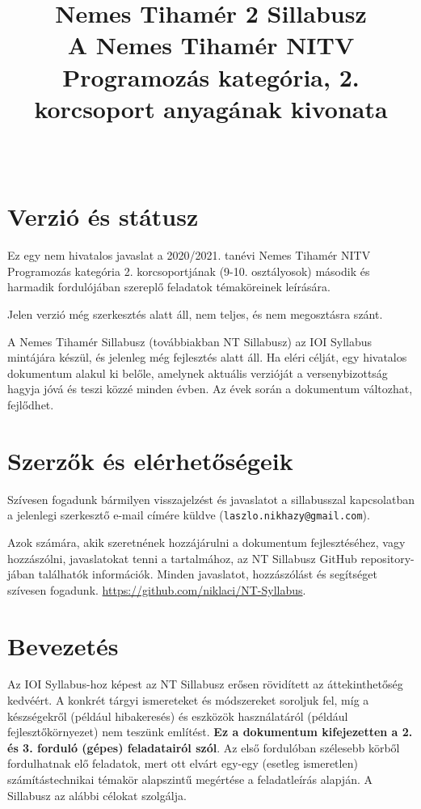 \documentclass[a4paper,11pt,oneside]{article}
\begin{document}
\title{\sf Nemes Tihamér 2 Sillabusz \\
    \large A Nemes Tihamér NITV Programozás kategória, 2. korcsoport anyagának kivonata}
\author{}
\date{~}
\maketitle

\section{Verzió és státusz}%

Ez egy nem hivatalos javaslat a 2020/2021. tanévi Nemes Tihamér NITV Programozás kategória
2. korcsoportjának (9-10. osztályosok) második és harmadik fordulójában szereplő feladatok
témaköreinek leírására.

\medskip

Jelen verzió még szerkesztés alatt áll, nem teljes, és nem megosztásra szánt.

\medskip

A Nemes Tihamér Sillabusz (továbbiakban NT Sillabusz) az IOI Syllabus mintájára készül,
és jelenleg még fejlesztés alatt áll. Ha eléri célját, egy hivatalos dokumentum alakul ki belőle,
amelynek aktuális verzióját a versenybizottság hagyja jóvá és teszi közzé minden évben.
Az évek során a dokumentum változhat, fejlődhet.


\section{Szerzők és elérhetőségeik}%

Szívesen fogadunk bármilyen visszajelzést és javaslatot a sillabusszal kapcsolatban
a jelenlegi szerkesztő e-mail címére küldve (\verb!laszlo.nikhazy@gmail.com!).

Azok számára, akik szeretnének hozzájárulni a dokumentum fejlesztéséhez, vagy hozzászólni,
javaslatokat tenni a tartalmához, az NT Sillabusz GitHub repository-jában találhatók információk.
Minden javaslatot, hozzászólást és segítséget szívesen fogadunk.
\url{https://github.com/niklaci/NT-Syllabus}.

\section{Bevezetés}\label{sec:intro}%

Az IOI Syllabus-hoz képest az NT Sillabusz erősen rövidített az áttekinthetőség kedvéért.
A konkrét tárgyi ismereteket és módszereket soroljuk fel, míg a készségekről (például hibakeresés)
és eszközök használatáról (például fejlesztőkörnyezet) nem teszünk említést. \textbf{Ez a dokumentum kifejezetten
a 2. és 3. forduló (gépes) feladatairól szól}. Az első fordulóban szélesebb körből fordulhatnak elő feladatok,
mert ott elvárt egy-egy (esetleg ismeretlen) számítástechnikai témakör alapszintű megértése a feladatleírás alapján.
A Sillabusz az alábbi célokat szolgálja.
\end{document}
